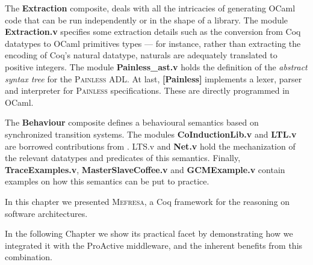 	The \textbf{Extraction} composite, deals with 
	all the intricacies of generating OCaml code that can be run independently or
	in the shape of a library. The module \textbf{Extraction.v}	specifies
	some extraction details such as the conversion from Coq datatypes
	to OCaml primitives types --- for instance, rather than extracting
	the encoding of Coq's natural datatype, naturals are adequately
	translated to positive integers. The module \textbf{Painless\_ast.v} holds 
	the definition of the \textit{abstract syntax tree}
	for the \textsc{Painless} \ac{ADL}. At last, \textbf{[Painless]} implements a 
	lexer, parser and interpreter for \textsc{Painless}
	specifications. These are directly programmed in OCaml.

   The \textbf{Behaviour} composite defines a behavioural semantics
   based on synchronized transition systems. The modules
   \textbf{CoInductionLib.v} and \textbf{LTL.v} are borrowed 
   contributions from \cite{opac-b1101046}. \textsf{LTS.v}
   and \textbf{Net.v} hold the mechanization of the relevant
   datatypes and predicates of this semantics. Finally,
   \textbf{TraceExamples.v}, \textbf{MasterSlaveCoffee.v} and 
   \textbf{GCMExample.v} contain examples on how this semantics
   can be put to practice.


\chapbreak

	In this chapter we presented \textsc{Mefresa}, a Coq framework for the reasoning on software architectures.
	
		In the following Chapter we show its practical facet by demonstrating how we integrated it		
		with the ProActive middleware, and the inherent benefits from this combination.



